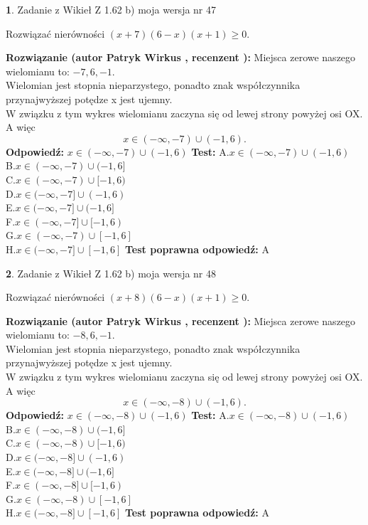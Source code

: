 \documentclass[12pt, a4paper]{article}
\theoremstyle{definition} %
\newtheorem{zad}{}
\newcommand{\zadStart}[1]{\begin{zad}#1\newline}
\newcommand{\zadStop}{\end{zad}}
\newcommand{\rozwStart}[2]{\noindent \textbf{Rozwiązanie (autor #1 , recenzent #2): }\newline}
\newcommand{\rozwStop}{\newline}
\newcommand{\odpStart}{\noindent \textbf{Odpowiedź:}\newline}
\newcommand{\odpStop}{\newline}
\newcommand{\testStart}{\noindent \textbf{Test:}\newline}
\newcommand{\testStop}{\newline}
\newcommand{\kluczStart}{\noindent \textbf{Test poprawna odpowiedź:}\newline}
\newcommand{\kluczStop}{\newline}
\begin{document}
\zadStart{Zadanie z Wikieł Z 1.62 b) moja wersja nr 47}

Rozwiązać nierówności $(x+7)(6-x)(x+1)\ge0$.
\zadStop
\rozwStart{Patryk Wirkus}{}
Miejsca zerowe naszego wielomianu to: $-7, 6, -1$.\\
Wielomian jest stopnia nieparzystego, ponadto znak współczynnika przy\linebreak najwyższej potędze x jest ujemny.\\ W związku z tym wykres wielomianu zaczyna się od lewej strony powyżej osi OX. A więc $$x \in (-\infty,-7) \cup (-1,6).$$
\rozwStop
\odpStart
$x \in (-\infty,-7) \cup (-1,6)$
\odpStop
\testStart
A.$x \in (-\infty,-7) \cup (-1,6)$\\
B.$x \in (-\infty,-7) \cup (-1,6]$\\
C.$x \in (-\infty,-7) \cup [-1,6)$\\
D.$x \in (-\infty,-7] \cup (-1,6)$\\
E.$x \in (-\infty,-7] \cup (-1,6]$\\
F.$x \in (-\infty,-7] \cup [-1,6)$\\
G.$x \in (-\infty,-7) \cup [-1,6]$\\
H.$x \in (-\infty,-7] \cup [-1,6]$
\testStop
\kluczStart
A
\kluczStop



\zadStart{Zadanie z Wikieł Z 1.62 b) moja wersja nr 48}

Rozwiązać nierówności $(x+8)(6-x)(x+1)\ge0$.
\zadStop
\rozwStart{Patryk Wirkus}{}
Miejsca zerowe naszego wielomianu to: $-8, 6, -1$.\\
Wielomian jest stopnia nieparzystego, ponadto znak współczynnika przy\linebreak najwyższej potędze x jest ujemny.\\ W związku z tym wykres wielomianu zaczyna się od lewej strony powyżej osi OX. A więc $$x \in (-\infty,-8) \cup (-1,6).$$
\rozwStop
\odpStart
$x \in (-\infty,-8) \cup (-1,6)$
\odpStop
\testStart
A.$x \in (-\infty,-8) \cup (-1,6)$\\
B.$x \in (-\infty,-8) \cup (-1,6]$\\
C.$x \in (-\infty,-8) \cup [-1,6)$\\
D.$x \in (-\infty,-8] \cup (-1,6)$\\
E.$x \in (-\infty,-8] \cup (-1,6]$\\
F.$x \in (-\infty,-8] \cup [-1,6)$\\
G.$x \in (-\infty,-8) \cup [-1,6]$\\
H.$x \in (-\infty,-8] \cup [-1,6]$
\testStop
\kluczStart
A
\kluczStop
\end{document}
